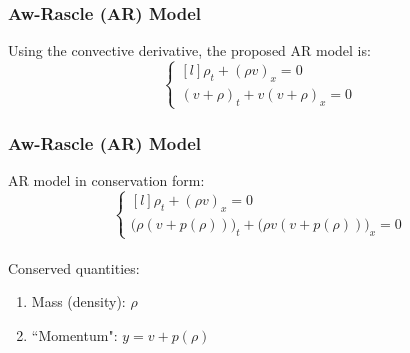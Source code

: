 \documentclass{beamer}
\begin{document}
\begin{frame}
\frametitle{Aw-Rascle (AR) Model}

Using the convective derivative, the proposed AR model is: \\[1ex]

\[ \left\{ \begin{matrix*}[l] \rho_t + (\rho v)_x = 0 \\[2ex] (v + \rho)_t + v(v + \rho)_x = 0 \end{matrix*} \right. \]

\end{frame}

\begin{frame}
\frametitle{Aw-Rascle (AR) Model}

AR model in conservation form: \\[3ex]

\[ \left\{ \begin{matrix*}[l] \rho_t + (\rho v)_x = 0 \\[2ex] \Big(\rho (v + p(\rho)) \Big)_t + \Big(\rho v(v + p(\rho)) \Big)_x = 0 \end{matrix*} \right. \] \\[5ex]

Conserved quantities:
\begin{enumerate}
\item Mass (density): $\rho$
\item ``Momentum": $y = v + p(\rho)$
\end{enumerate}

\end{frame}
\end{document}
